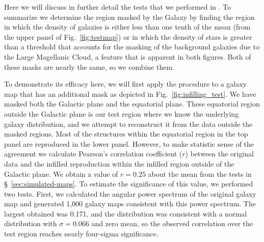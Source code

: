 \documentclass[useAMS,usenatbib]{mn2e}
\begin{document}
Here we will discuss in further detail the tests that we performed in
\citet{2016MNRAS.462.1085A}.  To summarize we determine the region
masked by the Galaxy by finding the region in which the density of
galaxies is either less than one tenth of the mean (from the upper
panel of Fig.~\ref{fig:testmap}) or in which the density of stars
\citep[from Fig.~2][]{2016MNRAS.462.1085A} is greater than a threshold
that accounts for the masking of the background galaxies due to the
Large Magellanic Cloud, a feature that is apparent in both figures.
Both of these masks are nearly the same, so we combine them.

To demonstrate its efficacy here, we will first apply the procedure to
a galaxy map that has an additional mask as depicted in
Fig.~\ref{fig:infilling_test}.  We have masked both the Galactic plane
and the equatorial plane.  These equatorial region outside the
Galactic plane is our test region where we know the underlying galaxy
distribution, and we attempt to reconstruct it from the data outside
the masked regions.  Most of the structures within the equatorial
region in the top panel are reproduced in the lower panel.  However,
to make statistic sense of the agreement we calculate Pearson's
correlation coefficient ($r$) between the original data and the
infilled reproduction within the infilled region outside of the
Galactic plane.  We obtain a value of $r=0.25$ about the mean from the
tests in \S~\ref{sec:simulated-maps}.  To estimate the significance of
this value, we performed two tests.  First, we calculated the angular
power spectrum of the original galaxy map and generated 1,000 galaxy
maps consistent with this power spectrum.  The largest obtained was
0.171, and the distribution was consistent with a normal distribution
with $\sigma=0.066$ and zero mean, so the observed correlation over
the test region reaches nearly four-sigma significance.
\end{document}
